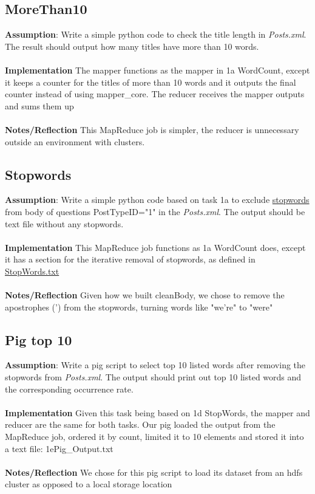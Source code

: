 \documentclass[fleqn,10pt]{wlscirep}
\begin{document}
\subsection{MoreThan10}
\textbf{Assumption}: Write a simple python code to check the title length in \textit{Posts.xml}. The result should output how many titles have more than 10 words.  \\ \\
\textbf{Implementation} The mapper functions as the mapper in 1a WordCount, except it keeps a counter for the titles of more than 10 words and it outputs the final counter instead of using mapper\_core.
The reducer receives the mapper outputs and sums them up \\ \\
\textbf{Notes/Reflection} This MapReduce job is simpler, the reducer is unnecessary outside an environment with clusters.


\subsection{Stopwords}
\textbf{Assumption}: Write a simple python code based on task 1a to exclude \href{https://raw.githubusercontent.com/naimdjon/stopwords/master/stopwords.txt}{stopwords} from body of questions PostTypeID="1" in the \textit{Posts.xml}. The output should be text file without any stopwords. \\ \\
\textbf{Implementation} This MapReduce job functions as 1a WordCount does, except it has a section for the iterative removal of stopwords, as defined in \href{https://raw.githubusercontent.com/naimdjon/stopwords/master/stopwords.txt}{StopWords.txt} \\ \\
\textbf{Notes/Reflection} Given how we built cleanBody, we chose to remove the apostrophes (') from the stopwords, turning words like "we're" to "were"



\subsection{Pig top 10}
\textbf{Assumption}: Write a pig script to select top 10 listed words after removing the stopwords from \textit{Posts.xml}. The output should print out top 10 listed words and the corresponding occurrence rate.\\ \\
\textbf{Implementation} Given this task being based on 1d StopWords, the mapper and reducer are the same for both tasks. Our pig loaded the output from the MapReduce job, ordered it by count, limited it to 10 elements and stored it into a text file: 1ePig\_Output.txt \\ \\
\textbf{Notes/Reflection} We chose for this pig script to load its dataset from an hdfs cluster as opposed to a local storage location

\end{document}
